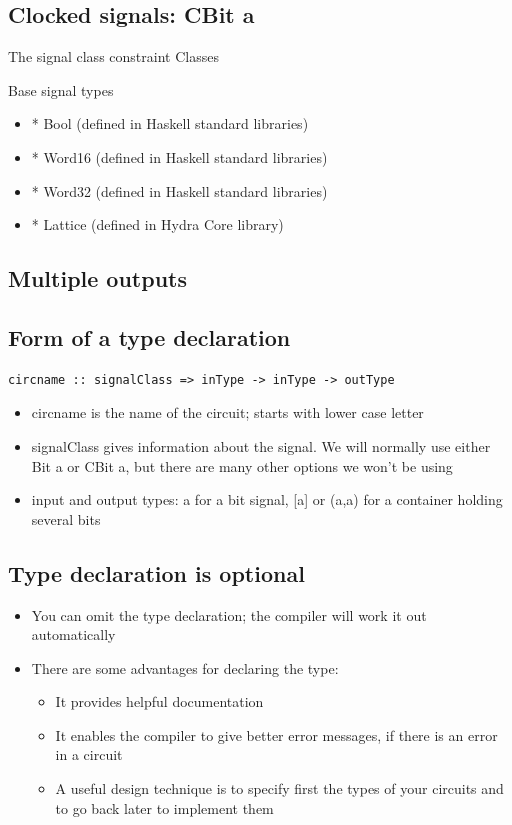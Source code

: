 \documentclass[]{svmono}
\begin{document}
\subsection*{Clocked signals: CBit a}
\label{sec:org6dda2a5}

The signal class constraint 
Classes

Base signal types

\begin{itemize}
\item * Bool    (defined in Haskell standard libraries)
\item * Word16  (defined in Haskell standard libraries)
\item * Word32  (defined in Haskell standard libraries)
\item * Lattice (defined in Hydra Core library)
\end{itemize}
\subsection*{Multiple outputs}
\label{sec:org0327f80}

\subsection*{Form of a type declaration}
\label{sec:org1f76b9e}

\begin{verbatim}
circname :: signalClass => inType -> inType -> outType
\end{verbatim}

\begin{itemize}
\item circname is the name of the circuit; starts with lower case letter
\item signalClass gives information about the signal.  We will
normally use either Bit a or CBit a, but there are many other
options we won't be using
\item input and output types: a for a bit signal, [a] or (a,a) for a
container holding several bits
\end{itemize}
\subsection*{Type declaration is optional}
\label{sec:org980e00c}

\begin{itemize}
\item You can omit the type declaration; the compiler will work it out
automatically
\item There are some advantages for declaring the type:

\begin{itemize}
\item It provides helpful documentation
\item It enables the compiler to give better error messages, if
there is an error in a circuit
\item A useful design technique is to specify first the types of
your circuits and to go back later to implement them
\end{itemize}
\end{itemize}
\end{document}

